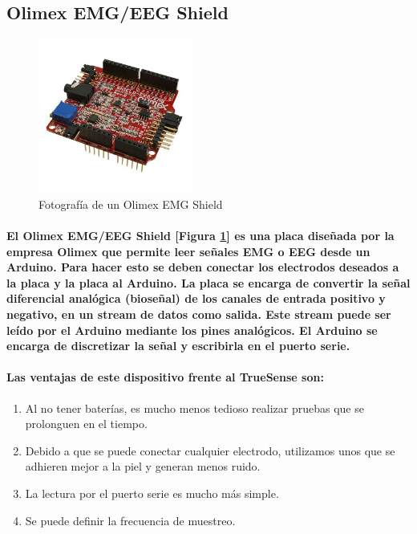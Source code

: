 \documentclass{article}
\begin{document}
\subsection{Olimex EMG/EEG Shield}

\begin{figure}[ht]
    \centering
    \includegraphics[width=2in]{SHIELD-EKG-EMG.jpg}%
    \caption{Fotografía de un Olimex EMG Shield}
    \label{fig:olimexshield}
\end{figure}

\paragraph{
El Olimex EMG/EEG Shield [Figura \ref{fig:olimexshield}] es una placa diseñada por la empresa Olimex que permite leer señales EMG o EEG desde un Arduino. Para hacer esto se deben conectar los electrodos deseados a la placa y la placa al Arduino. La placa se encarga de convertir la señal diferencial analógica (bioseñal) de los canales de entrada positivo y negativo, en un stream de datos como salida. Este stream puede ser leído por el Arduino mediante los pines analógicos. El Arduino se encarga de discretizar la señal y escribirla en el puerto serie.
}

\paragraph{
Las ventajas de este dispositivo frente al TrueSense son:
}

\begin{enumerate}
  \item Al no tener baterías, es mucho menos tedioso realizar pruebas que se prolonguen en el tiempo.
  \item Debido a que se puede conectar cualquier electrodo, utilizamos unos que se adhieren mejor a la piel y generan menos ruido.
  \item La lectura por el puerto serie es mucho más simple.
  \item Se puede definir la frecuencia de muestreo.
\end{enumerate}
\end{document}
